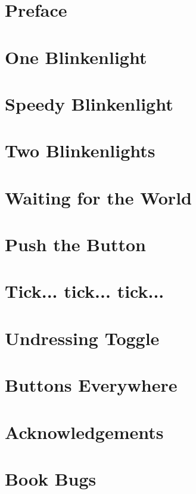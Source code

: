 \documentclass[a5paper,oneside]{scrbook}
\begin{document}
	



\tableofcontents

\chapter*{Preface\label{preface}}


\chapter{One Blinkenlight\label{ch1}}


\chapter{Speedy Blinkenlight\label{ch2}}


\chapter{Two Blinkenlights\label{ch3}}


\chapter*{Waiting for the World\label{medio1}}


\chapter{Push the Button\label{ch4}}


\chapter{Tick... tick... tick...\label{ch5a}}


\chapter{Undressing Toggle\label{ch5}}



\chapter{Buttons Everywhere\label{ch6}}


\chapter{Acknowledgements\label{acknowledgements}}


\chapter{Book Bugs\label{bugs}}

\end{document}
